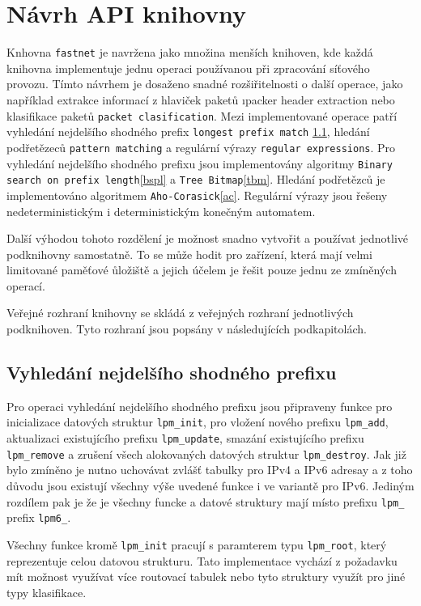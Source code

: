 \chapter{Návrh API knihovny}\label{chapter:api}
Knhovna \texttt{fastnet} je navržena jako množina menších knihoven, kde každá knihovna implementuje
jednu operaci používanou při zpracování síťového provozu.
Tímto návrhem je dosaženo snadné rozšiřitelnosti o další operace, jako například extrakce informací z hlaviček paketů
\i{packer header extraction} nebo klasifikace paketů \texttt{packet clasification}.
Mezi implementované operace patří vyhledání nejdelšího shodného prefix \texttt{longest prefix match} \ref{},
hledání podřetězeců \texttt{pattern matching} a regulární výrazy \texttt{regular expressions}.
Pro vyhledání nejdelšího shodného prefixu jsou implementovány algoritmy
\texttt{Binary search on prefix length}\ref{bspl} a \texttt{Tree Bitmap}\ref{tbm}.
Hledání podřetězců je implementováno algoritmem \texttt{Aho-Corasick}\ref{ac}.
Regulární výrazy jsou řešeny nedeterministickým i deterministickým konečným automatem.

Další výhodou tohoto rozdělení je možnost snadno vytvořit a používat jednotlivé podknihovny samostatně.
To se může hodit pro zařízení, která mají velmi limitované paměťové ůložiště a jejich účelem
je řešit pouze jednu ze zmíněných operací.

Veřejné rozhraní knihovny se skládá z veřejných rozhraní jednotlivých podknihoven.
Tyto rozhraní jsou popsány v následujících podkapitolách.

\section{Vyhledání nejdelšího shodného prefixu}

Pro operaci vyhledání nejdelšího shodného prefixu jsou připraveny funkce pro inicializace datových struktur
\texttt{lpm\_init}, pro vložení nového prefixu \texttt{lpm\_add}, aktualizaci existujícího prefixu
\texttt{lpm\_update}, smazání existujícího prefixu \texttt{lpm\_remove} a zrušení všech alokovaných
datových struktur \texttt{lpm\_destroy}. Jak již bylo zmíněno je nutno uchovávat zvlášť tabulky
pro IPv4 a IPv6 adresay a z toho důvodu jsou existují všechny výše uvedené funkce i ve variantě
pro IPv6. Jediným rozdílem pak je že je všechny funcke a datové struktury mají místo prefixu
\texttt{lpm\_} prefix \texttt{lpm6\_}.

Všechny funkce kromě \texttt{lpm\_init} pracují s paramterem typu \texttt{lpm\_root}, který reprezentuje
celou datovou strukturu. Tato implementace vychází z požadavku mít možnost využívat více routovací
tabulek nebo tyto struktury využít pro jiné typy klasifikace.

